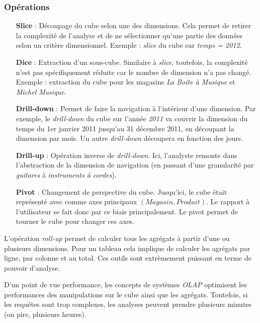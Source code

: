 \subsubsection{Opérations}
\begin{itemize}
	\item[\textbf{Slice}] : Découpage du cube selon une des dimensions. Cela permet de retirer la complexité de l'analyse et de ne sélectionner qu'une partie des données selon un critère dimensionnel. Exemple : \textit{slice} du cube sur \textit{temps = 2012}.
	\item[\textbf{Dice}] : Extraction d'un sous-cube. Similaire à \textit{slice}, toutefois, la complexité n'est pas spécifiquement réduite car le nombre de dimension n'a pas changé. Exemple : extraction du cube pour les magasins \textit{La Boite à Musique} et \textit{Michel Musique}.
	\item[\textbf{Drill-down}] : Permet de faire la navigation à l'intérieur d'une dimension. Par exemple, le \textit{drill-down} du cube sur l'année \textit{2011} va couvrir la dimension du temps du 1er janvier 2011 jusqu'au 31 décembre 2011, en découpant la dimension par mois. Un autre \textit{drill-down} découpera en fonction des jours.
	\item[\textbf{Drill-up}] : Opération inverse de \textit{drill-down}. Ici, l'analyste remonte dans l'abstraction de la dimension de navigation (en passant d'une granularité par \textit{guitares} à \textit{instruments à cordes}).
	\item[\textbf{Pivot}] : Changement de perspective du cube. Jusqu'ici, le cube était représenté avec comme axes principaux $(Magasin, Produit)$. Le rapport à l'utilisateur se fait donc par ce biais principalement. Le pivot permet de tourner le cube pour changer ces axes.
\end{itemize}
L'opération \textit{roll-up} permet de calculer tous les agrégats à partir d'une ou plusieurs dimensions. Pour un tableau cela implique de calculer les agrégats par ligne, par colonne et au total. Ces outils sont extrèmement puissant en terme de pouvoir d'analyse.

D'un point de vue performance, les concepts de systèmes \textit{OLAP} optimisent les performances des manipulations sur le cube ainsi que les agrégats. Toutefois, si les requêtes sont trop complexes, les analyses peuvent prendre plusieurs minutes (ou pire, plusieurs heures).

